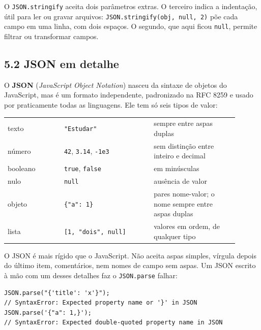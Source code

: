 O \texttt{JSON.stringify} aceita dois parâmetros extras. O terceiro indica a indentação, útil para ler ou gravar arquivos: \texttt{JSON.stringify(obj, null, 2)} põe cada campo em uma linha, com dois espaços. O segundo, que aqui ficou \texttt{null}, permite filtrar ou transformar campos.

\subsection{5.2 JSON em detalhe}

O \textbf{JSON} (\textit{JavaScript Object Notation}) nasceu da sintaxe de objetos do JavaScript, mas é um formato independente, padronizado na RFC 8259 e usado por praticamente todas as linguagens. Ele tem só seis tipos de valor:

\begin{center}
\begin{tabular}{@{}P{0.22\linewidth}P{0.35\linewidth}P{0.33\linewidth}@{}}
\toprule
{}
 &  &  \\
\midrule
texto & \texttt{"Estudar"} & sempre entre aspas duplas \\
 número & \texttt{42}, \texttt{3.14}, \texttt{-1e3} & sem distinção entre inteiro e decimal \\
booleano & \texttt{true}, \texttt{false} & em minúsculas \\
 nulo & \texttt{null} & ausência de valor \\
objeto & \texttt{\{"a": 1\}} & pares nome-valor; o nome sempre entre aspas duplas \\
 lista & \texttt{[1, "dois", null]} & valores em ordem, de qualquer tipo \\
\bottomrule
\end{tabular}
\end{center}

O JSON é mais rígido que o JavaScript. Não aceita aspas simples, vírgula depois do último item, comentários, nem nomes de campo sem aspas. Um JSON escrito à mão com um desses detalhes faz o \texttt{JSON.parse} falhar:

\begin{codigo}
\begin{Verbatim}[breaklines=true, breaksymbolleft={}, fontsize=\footnotesize]
JSON.parse("{'title': 'x'}");
// SyntaxError: Expected property name or '}' in JSON
JSON.parse('{"a": 1,}');
// SyntaxError: Expected double-quoted property name in JSON
\end{Verbatim}
\end{codigo}

